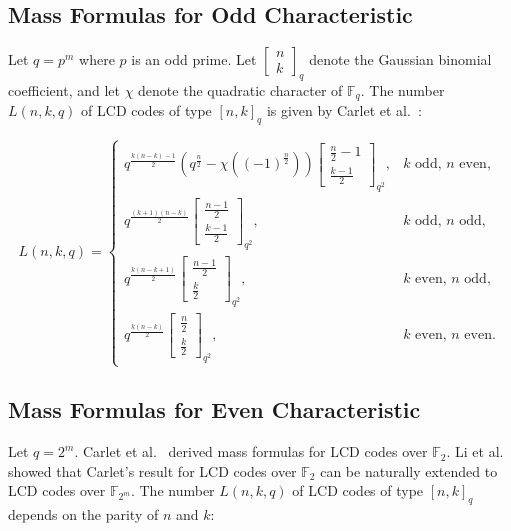 \documentclass[11pt]{article}
\newcommand{\0}{\mathbf{0}}
\newcommand{\1}{\mathbf{1}}
\theoremstyle{plain}
\theoremstyle{definition}
\theoremstyle{remark}
\begin{document}
\subsection{Mass Formulas for Odd Characteristic}
\label{app:mass_odd}

Let $q = p^m$ where $p$ is an odd prime. Let $\left[\begin{smallmatrix} n \\ k \end{smallmatrix}\right]_q$ denote the Gaussian binomial coefficient, and let $\chi$ denote the quadratic character of $\mathbb{F}_q$. The number $L(n,k,q)$ of LCD codes of type $[n,k]_q$ is given by Carlet et al.~\cite[Corollary~32]{carlet2019new}:

$$
L(n,k,q) = \begin{cases}
q^{\frac{k(n-k)-1}{2}} \left( q^{\frac{n}{2}} - \chi((-1)^{\frac{n}{2}}) \right) \left[\begin{smallmatrix} \frac{n}{2}-1 \\ \frac{k-1}{2} \end{smallmatrix}\right]_{q^2}, & k \text{ odd, } n \text{ even,} \\[6pt]
q^{\frac{(k+1)(n-k)}{2}} \left[\begin{smallmatrix} \frac{n-1}{2} \\ \frac{k-1}{2} \end{smallmatrix}\right]_{q^2}, & k \text{ odd, } n \text{ odd,} \\[6pt]
q^{\frac{k(n-k+1)}{2}} \left[\begin{smallmatrix} \frac{n-1}{2} \\ \frac{k}{2} \end{smallmatrix}\right]_{q^2}, & k \text{ even, } n \text{ odd,} \\[6pt]
q^{\frac{k(n-k)}{2}} \left[\begin{smallmatrix} \frac{n}{2} \\ \frac{k}{2} \end{smallmatrix}\right]_{q^2}, & k \text{ even, } n \text{ even.}
\end{cases}
$$

\subsection{Mass Formulas for Even Characteristic}

Let $q = 2^m$. Carlet et al.~\cite[Corollary~17]{carlet2019new} derived mass formulas for LCD codes over $\mathbb{F}_2$. Li et al.~\cite[Theorem~2 and subsequent remark]{lishiling2025} showed that Carlet's result for LCD codes over $\mathbb{F}_2$ can be naturally extended to LCD codes over $\mathbb{F}_{2^m}$. The number $L(n,k,q)$ of LCD codes of type $[n,k]_q$ depends on the parity of $n$ and $k$:
\end{document}
